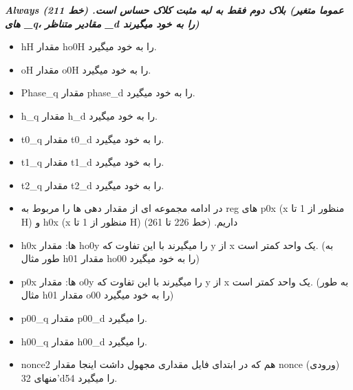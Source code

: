 \textit{\textbf{Always بلاک دوم فقط به لبه مثبت کلاک حساس است. (خط 211)
	(عموما متغیر های \_q، مقادیر متناظر \_d را به خود میگیرند) }}
\begin{itemize}
	\item
	      hH مقدار ho0H را به خود میگیرد.
	\item
	      oH مقدار o0H را به خود میگیرد.
	\item
	      Phase\_q مقدار phase\_d را به خود میگیرد.
	\item
	      h\_q مقدار h\_d را به خود میگیرد.
	\item
	      t0\_q مقدار t0\_d را به خود میگیرد.
	\item
	      t1\_q مقدار t1\_d را به خود میگیرد.
	\item
	      t2\_q مقدار t2\_d را به خود میگیرد.
	\item
	      در ادامه مجموعه ای از مقدار دهی ها را مربوط به reg های p0x (x منظور از 1  تا H) و h0x (x منظور از   1  تا H) داریم. (خط 226 تا 261)
	\item
	      h0x ها: مقدار ho0y را میگیرند با این تفاوت که y از x یک واحد کمتر است. (به طور مثال h01 مقدار ho00 را به خود میگیرد)
	\item
	      p0x  ها: مقدار o0y را میگیرند با این تفاوت که y از x یک واحد کمتر است. (به طور مثال h01 مقدار o00 را به خود میگیرد)
	\item
	      p00\_q مقدار p00\_d را میگیرد.
	\item
	      h00\_q مقدار h00\_d را میگیرد.
	\item
	      nonce2 هم که در ابتدای فایل مقداری مجهول داشت اینجا مقدار nonce (ورودی)  منهای 32’d54 را میگیرد.
\end{itemize}